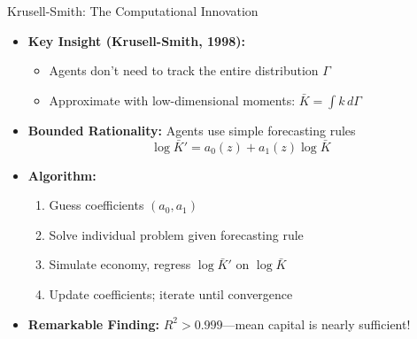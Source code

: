 \documentclass[10pt,english,aspectratio=169]{beamer}
\begin{document}
\begin{frame}{Krusell-Smith: The Computational Innovation}
\begin{itemize}
\item \textbf{Key Insight (Krusell-Smith, 1998):}
\begin{itemize}
    \item Agents don't need to track the entire distribution $\Gamma$
    \item Approximate with low-dimensional moments: $\bar{K} = \int k \, d\Gamma$
\end{itemize}

\medskip
\item \textbf{Bounded Rationality:} Agents use simple forecasting rules
\[
\log \bar{K}' = a_0(z) + a_1(z) \log \bar{K}
\]

\medskip
\item \textbf{Algorithm:}
\begin{enumerate}
    \item Guess coefficients $(a_0, a_1)$
    \item Solve individual problem given forecasting rule
    \item Simulate economy, regress $\log \bar{K}'$ on $\log \bar{K}$
    \item Update coefficients; iterate until convergence
\end{enumerate}

\medskip
\item \textbf{Remarkable Finding:} $R^2 > 0.999$---mean capital is nearly sufficient!
\end{itemize}
\end{frame}

\end{document}
